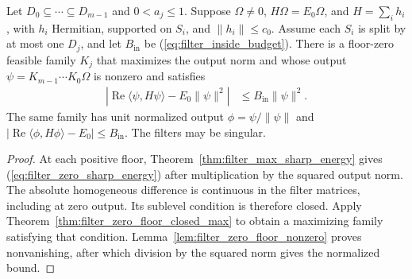 \begin{theorem}
    \label{thm:filter_zero_floor_sharp_energy}
    \leanok
    Let $D_0\subseteq\cdots\subseteq D_{m-1}$ and $0<a_j\le1$.
    Suppose $\Omega\ne0$, $H\Omega=E_0\Omega$, and $H=\sum_i h_i$,
    with $h_i$ Hermitian, supported on $S_i$, and
    $\lVert h_i\rVert\le c_0$. Assume each $S_i$ is split by at
    most one $D_j$, and let $B_{\mathrm{in}}$ be
    (\ref{eq:filter_inside_budget}). There is a floor-zero feasible
    family $K_j$ that maximizes the output norm and whose output
    $\psi=K_{m-1}\cdots K_0\Omega$ is nonzero and satisfies
    \begin{align}
        |\operatorname{Re}\langle\psi,H\psi\rangle-E_0\lVert\psi\rVert^2|
         & \le B_{\mathrm{in}}\lVert\psi\rVert^2.
        \label{eq:filter_zero_sharp_energy}
    \end{align}
    The same family has unit normalized output
    $\phi=\psi/\lVert\psi\rVert$ and
    $|\operatorname{Re}\langle\phi,H\phi\rangle-E_0|
        \le B_{\mathrm{in}}$. The filters may be singular.
\end{theorem}
\begin{proof}\leanok
    At each positive floor, Theorem~\ref{thm:filter_max_sharp_energy}
    gives (\ref{eq:filter_zero_sharp_energy}) after multiplication
    by the squared output norm. The absolute homogeneous difference
    is continuous in the filter matrices, including at zero output.
    Its sublevel condition is therefore closed. Apply
    Theorem~\ref{thm:filter_zero_floor_closed_max} to obtain a
    maximizing family satisfying that condition.
    Lemma~\ref{lem:filter_zero_floor_nonzero} proves nonvanishing,
    after which division by the squared norm gives the normalized bound.
\end{proof}

